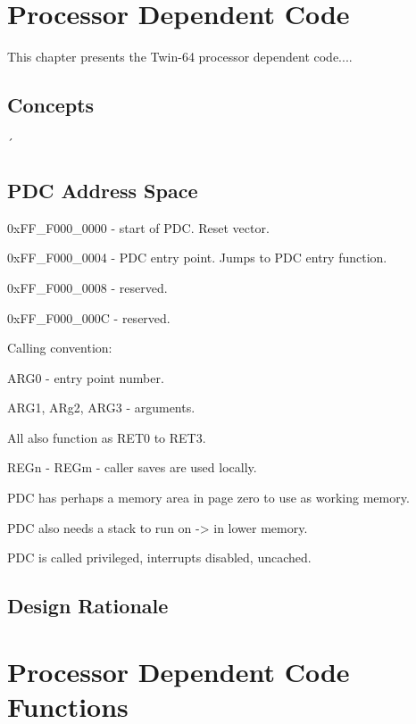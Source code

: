\chapter*{Processor Dependent Code}
This chapter presents the Twin-64 processor dependent code....

\section*{Concepts}
´
\section*{PDC Address Space}

0xFF\_F000\_0000 - start of PDC. Reset vector. 

0xFF\_F000\_0004 - PDC entry point. Jumps to PDC entry function.

0xFF\_F000\_0008 - reserved.

0xFF\_F000\_000C - reserved.

Calling convention:

ARG0 - entry point number.

ARG1, ARg2, ARG3 - arguments.

All also function as RET0 to RET3.

REGn - REGm - caller saves are used locally.

PDC has perhaps a memory area in page zero to use as working memory.

PDC also needs a stack to run on -> in lower memory.

PDC is called privileged, interrupts disabled, uncached.


 

\section*{Design Rationale}

\chapter*{Processor Dependent Code Functions}




